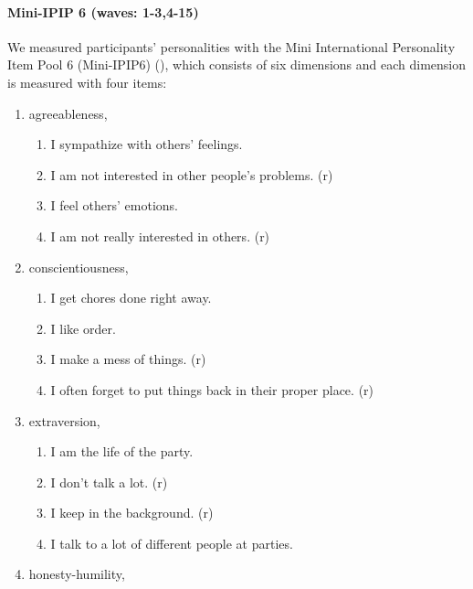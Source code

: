 \documentclass[
  singlecolumn]{article}
\let\oldparagraph\paragraph
\renewcommand{\paragraph}[1]{\oldparagraph{#1}\mbox{}}
\providecommand{\tightlist}{%
  \setlength{\itemsep}{0pt}\setlength{\parskip}{0pt}}\usepackage{longtable,booktabs,array}
\begin{document}
\paragraph{Mini-IPIP 6 (waves:
1-3,4-15)}\label{mini-ipip-6-waves-1-34-15}

We measured participants' personalities with the Mini International
Personality Item Pool 6 (Mini-IPIP6) (), which consists of six dimensions and each
dimension is measured with four items:

\begin{enumerate}
\def\labelenumi{\arabic{enumi}.}
\item
  agreeableness,

  \begin{enumerate}
  \def\labelenumii{\roman{enumii}.}
  \tightlist
  \item
    I sympathize with others' feelings.
  \item
    I am not interested in other people's problems. (r)
  \item
    I feel others' emotions.
  \item
    I am not really interested in others. (r)
  \end{enumerate}
\item
  conscientiousness,

  \begin{enumerate}
  \def\labelenumii{\roman{enumii}.}
  \tightlist
  \item
    I get chores done right away.
  \item
    I like order.
  \item
    I make a mess of things. (r)
  \item
    I often forget to put things back in their proper place. (r)
  \end{enumerate}
\item
  extraversion,

  \begin{enumerate}
  \def\labelenumii{\roman{enumii}.}
  \tightlist
  \item
    I am the life of the party.
  \item
    I don't talk a lot. (r)
  \item
    I keep in the background. (r)
  \item
    I talk to a lot of different people at parties.
  \end{enumerate}
\item
  honesty-humility,


\end{enumerate}
\end{document}
